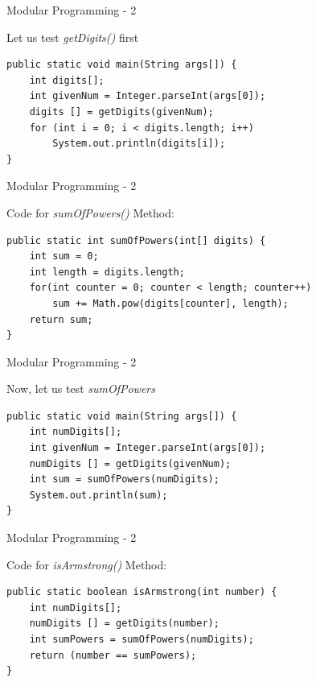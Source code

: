 \documentclass[14pt]{beamer}
\begin{document}
\begin{frame}[fragile]{Modular Programming - 2}
\begin{block}{Let us test \emph{getDigits()} first}
\begin{lstlisting}[numbers=none]
public static void main(String args[]) {		
    int digits[];
    int givenNum = Integer.parseInt(args[0]);
    digits [] = getDigits(givenNum);
    for (int i = 0; i < digits.length; i++)
        System.out.println(digits[i]);
}
\end{lstlisting}
\end{block}
\end{frame}

\begin{frame}[fragile]{Modular Programming - 2}
\begin{block}{Code for \emph{sumOfPowers()} Method:}
\begin{lstlisting}[numbers=none]
public static int sumOfPowers(int[] digits) {
    int sum = 0;
    int length = digits.length;
    for(int counter = 0; counter < length; counter++)
        sum += Math.pow(digits[counter], length);
    return sum;
}
\end{lstlisting}
\end{block}
\end{frame}

\begin{frame}[fragile]{Modular Programming - 2}
\begin{block}{Now, let us test \emph{sumOfPowers}}
\begin{lstlisting}[numbers=none]
public static void main(String args[]) {		
    int numDigits[];
    int givenNum = Integer.parseInt(args[0]);
    numDigits [] = getDigits(givenNum);
    int sum = sumOfPowers(numDigits);
    System.out.println(sum);
}
\end{lstlisting}
\end{block}
\end{frame}

\begin{frame}[fragile]{Modular Programming - 2}
\begin{block}{Code for \emph{isArmstrong()} Method:}
\begin{lstlisting}[numbers=none]
public static boolean isArmstrong(int number) {		
    int numDigits[];
    numDigits [] = getDigits(number);
    int sumPowers = sumOfPowers(numDigits);
    return (number == sumPowers);
}
\end{lstlisting}
\end{block}
\end{frame}
\end{document}

